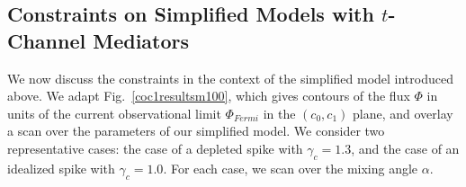 \documentclass[11pt]{article}
\begin{document}
%
%




\subsection{Constraints on Simplified Models with $t$-Channel Mediators}

We now discuss the constraints in the context of the simplified model introduced above. We adapt Fig.~\ref{coc1resultsm100}, which gives contours of the flux $\Phi$ in units of the current observational limit $\Phi_{Fermi}$ in the $(c_0, c_1)$ plane, and overlay a scan over the parameters of our simplified model. We consider two representative cases: the case of a depleted spike with $\gamma_c = 1.3$, and the case of an idealized spike with $\gamma_c = 1.0$. For each case, we scan over the mixing angle $\alpha$. %
\end{document}
